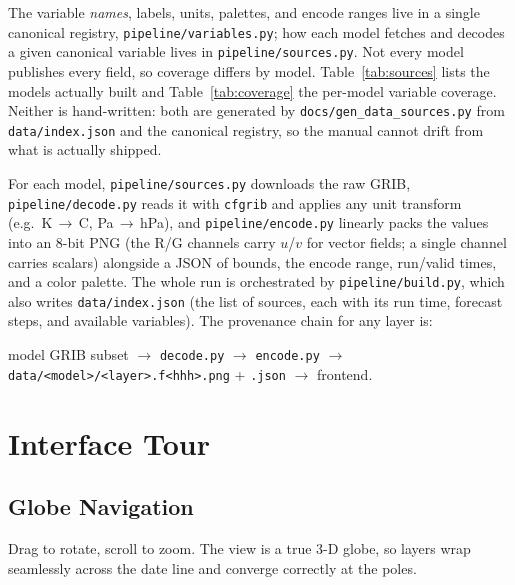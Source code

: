 \documentclass[11pt,letterpaper]{article}
\begin{document}
The variable \emph{names}, labels, units, palettes, and encode ranges live in a
single canonical registry, \texttt{pipeline/variables.py}; how each model fetches
and decodes a given canonical variable lives in \texttt{pipeline/sources.py}. Not
every model publishes every field, so coverage differs by model.
Table~\ref{tab:sources} lists the models actually built and
Table~\ref{tab:coverage} the per-model variable coverage. Neither is
hand-written: both are generated by \texttt{docs/gen\_data\_sources.py} from
\texttt{data/index.json} and the canonical registry, so the manual cannot drift
from what is actually shipped.



For each model, \texttt{pipeline/sources.py} downloads the raw GRIB,
\texttt{pipeline/decode.py} reads it with \texttt{cfgrib} and applies any unit
transform (e.g.\ K\,$\to$\,\textdegree{}C, Pa\,$\to$\,hPa), and
\texttt{pipeline/encode.py} linearly packs the values into an 8-bit PNG (the R/G
channels carry $u$/$v$ for vector fields; a single channel carries scalars)
alongside a JSON of bounds, the encode range, run/valid times, and a color
palette. The whole run is orchestrated by \texttt{pipeline/build.py}, which also
writes \texttt{data/index.json} (the list of sources, each with its run time,
forecast steps, and available variables). The provenance chain for any layer is:
\begin{center}
model GRIB subset $\rightarrow$ \texttt{decode.py} $\rightarrow$
\texttt{encode.py} $\rightarrow$ \texttt{data/<model>/<layer>.f<hhh>.png} +
\texttt{.json} $\rightarrow$ frontend.
\end{center}

\section{Interface Tour}

\subsection{Globe Navigation}
Drag to rotate, scroll to zoom. The view is a true 3-D globe, so layers wrap
seamlessly across the date line and converge correctly at the poles.
\end{document}
